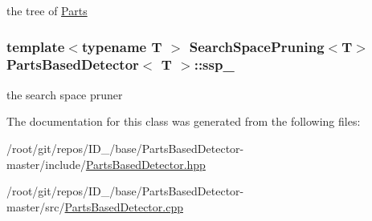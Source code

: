 the tree of \hyperlink{classParts}{\-Parts} 

\hypertarget{classPartsBasedDetector_aae91c693f9d01e3e6cbd552d7f81e474}{
\subsubsection[{ssp\-\_\-}]{\setlength{\rightskip}{0pt plus 5cm}template$<$typename T $>$ {\bf \-Search\-Space\-Pruning}$<$\-T$>$ {\bf \-Parts\-Based\-Detector}$<$ \-T $>$\-::{\bf ssp\-\_\-}}}\label{classPartsBasedDetector_aae91c693f9d01e3e6cbd552d7f81e474}


the search space pruner 



\-The documentation for this class was generated from the following files\-:\begin{DoxyCompactItemize}
\item 
/root/git/repos/\-I\-D\-\_/base/\-Parts\-Based\-Detector-\/master/include/\hyperlink{PartsBasedDetector_8hpp}{\-Parts\-Based\-Detector.\-hpp}\item 
/root/git/repos/\-I\-D\-\_/base/\-Parts\-Based\-Detector-\/master/src/\hyperlink{PartsBasedDetector_8cpp}{\-Parts\-Based\-Detector.\-cpp}\end{DoxyCompactItemize}
